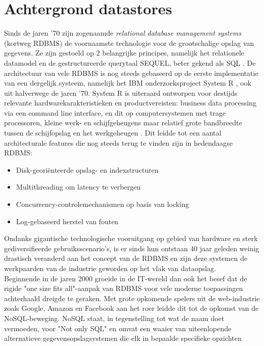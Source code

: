 \chapter{Achtergrond datastores}
\label{cha2}

Sinds de jaren '70 zijn zogenaamde \textit{relational database management systems} (kortweg RDBMS) de voornaamste technologie voor de grootschalige opslag van gegevens. Ze zijn gestoeld op 2 belangrijke principes, namelijk het relationele datamodel \cite{codd1970relational} en de gestructureerde querytaal SEQUEL, beter gekend als SQL \cite{chamberlin1974sequel}. De architectuur van vele RDBMS is nog steeds gebaseerd op de eerste implementatie van een dergelijk systeem, namelijk het IBM onderzoeksproject System R \cite{blasgen1981system}, ook uit halverwege de jaren '70. System R is uiteraard ontworpen voor destijds relevante hardwarekarakteristieken en productvereisten: business data processing via een command line interface, en dit op computersystemen met trage processoren, kleine werk- en schijfgeheugens maar relatief grote bandbreedte tussen de schijfopslag en het werkgeheugen \cite{Stonebraker:2007:EAE:1325851.1325981}. Dit leidde tot een aantal architecturale features die nog steeds terug te vinden zijn in hedendaagse RDBMS:
\begin{itemize}
\item Disk-geori\"enteerde opslag- en indexstructuren
\item Multithreading om latency te verbergen
\item Concurrency-controlemechanismen op basis van locking
\item Log-gebaseerd herstel van fouten
\end{itemize} 
Ondanks gigantische technologische vooruitgang op gebied van hardware en sterk gediversifieerde gebruiksscenario's, is er sinds hun ontstaan 40 jaar geleden weinig drastisch veranderd aan het concept van de RDBMS en zijn deze systemen de werkpaarden van de industrie geworden op het vlak van dataopslag.\\

Beginnende in de jaren 2000 groeide in de IT-wereld dan ook het besef dat de rigide "one size fits all"-aanpak van RDBMS voor vele moderne toepassingen achterhaald dreigde te geraken. Met grote opkomende spelers uit de web-industrie zoals Google, Amazon en Facebook aan het roer leidde dit tot de opkomst van de NoSQL-beweging. NoSQL staat, in tegenstelling tot wat de naam doet vermoeden, voor "Not only SQL" en omvat een waaier van uiteenlopende alternatieve gegevensopslagsystemen die elk in bepaalde specifieke opzichten meerwaarde trachten te bieden ten opzichte van het klassieke relationele systemen. In tegenstelling tot de 'Zwitsers zakmes'-aanpak van RDMBS, leggen ze zich toe op zeer gespecialiseerde toepassingsdomeinen en proberen daarin relationele systemen te overtreffen. Vaak betekent dit dat NoSQL systemen vele voor hun doel onnodig geachte features van SQL systemen achterwege laten, of afzwakken. Een goed voorbeeld hiervan zijn de ACID-eigenschappen uit het relationele model die in vele NoSQL-systemen gereduceerd zijn tot zogenaamde BASE-eigenschappen (op het verschil tussen beide komt onderstaande sectie nog uitgebreid terug).

